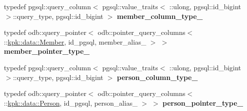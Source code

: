 \begin{DoxyCompactItemize}
\item 
typedef pgsql\+::query\+\_\+column$<$ pgsql\+::value\+\_\+traits$<$ \+::ulong, pgsql\+::id\+\_\+bigint $>$\+::query\+\_\+type, pgsql\+::id\+\_\+bigint $>$ {\bfseries member\+\_\+column\+\_\+type\+\_\+}\hypertarget{structodb_1_1query__columns_3_01_1_1kpk_1_1data_1_1_loan_00_01id__pgsql_00_01_a_01_4_affea535c0cd4ed7be8a0e3a383eb44c7}{}\label{structodb_1_1query__columns_3_01_1_1kpk_1_1data_1_1_loan_00_01id__pgsql_00_01_a_01_4_affea535c0cd4ed7be8a0e3a383eb44c7}

\item 
typedef odb\+::query\+\_\+pointer$<$ odb\+::pointer\+\_\+query\+\_\+columns$<$ \+::\hyperlink{classkpk_1_1data_1_1_member}{kpk\+::data\+::\+Member}, id\+\_\+pgsql, member\+\_\+alias\+\_\+ $>$ $>$ {\bfseries member\+\_\+pointer\+\_\+type\+\_\+}\hypertarget{structodb_1_1query__columns_3_01_1_1kpk_1_1data_1_1_loan_00_01id__pgsql_00_01_a_01_4_a64f58363e21fc30e0ac50287fcf853b5}{}\label{structodb_1_1query__columns_3_01_1_1kpk_1_1data_1_1_loan_00_01id__pgsql_00_01_a_01_4_a64f58363e21fc30e0ac50287fcf853b5}

\item 
typedef pgsql\+::query\+\_\+column$<$ pgsql\+::value\+\_\+traits$<$ \+::ulong, pgsql\+::id\+\_\+bigint $>$\+::query\+\_\+type, pgsql\+::id\+\_\+bigint $>$ {\bfseries person\+\_\+column\+\_\+type\+\_\+}\hypertarget{structodb_1_1query__columns_3_01_1_1kpk_1_1data_1_1_loan_00_01id__pgsql_00_01_a_01_4_a35795125f92f482278b1abe46d3d5bcb}{}\label{structodb_1_1query__columns_3_01_1_1kpk_1_1data_1_1_loan_00_01id__pgsql_00_01_a_01_4_a35795125f92f482278b1abe46d3d5bcb}

\item 
typedef odb\+::query\+\_\+pointer$<$ odb\+::pointer\+\_\+query\+\_\+columns$<$ \+::\hyperlink{classkpk_1_1data_1_1_person}{kpk\+::data\+::\+Person}, id\+\_\+pgsql, person\+\_\+alias\+\_\+ $>$ $>$ {\bfseries person\+\_\+pointer\+\_\+type\+\_\+}\hypertarget{structodb_1_1query__columns_3_01_1_1kpk_1_1data_1_1_loan_00_01id__pgsql_00_01_a_01_4_a2bee4d6ae710402a4cb62e5d5b21328b}{}\label{structodb_1_1query__columns_3_01_1_1kpk_1_1data_1_1_loan_00_01id__pgsql_00_01_a_01_4_a2bee4d6ae710402a4cb62e5d5b21328b}

\end{DoxyCompactItemize}
